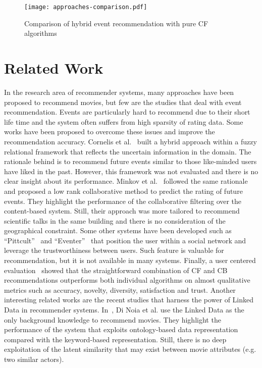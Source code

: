 \begin{figure}[H]
  \centering
  \texttt{[image: approaches-comparison.pdf]}
  \caption{Comparison of hybrid event recommendation with pure CF algorithms}
  \label{fig:approaches-comparison}
\end{figure}

\section{Related Work}
\label{sec:related-work}
In the research area of recommender systems, many approaches have been proposed to recommend movies, but few are the studies that deal with event recommendation. Events are particularly hard to recommend due to their short life time and the system often suffers from high sparsity of rating data. Some works have been proposed to overcome these issues and improve the recommendation accuracy. Cornelis et al.~\cite{Cornelis:IICAI05} built a hybrid approach within a fuzzy relational framework that reflects the uncertain information in the domain. The rationale behind is to recommend future events similar to those like-minded users have liked in the past. However, this framework was not evaluated and there is no clear insight about its performance. Minkov et al.~\cite{Minkov:CIKM10} followed the same rationale and proposed a low rank collaborative method to predict the rating of future events. They highlight the performance of the collaborative filtering over the content-based system. Still, their approach was more tailored to recommend scientific talks in the same building and there is no consideration of the geographical constraint. Some other systems have been developed such as ``Pittcult''~\cite{Lee:RecSys08} and ``Eventer''~\cite{Kayaalp:ASONAM09} that position the user within a social network and leverage the trustworthiness between users. Such feature is valuable for recommendation, but it is not available in many systems. Finally, a user centered evaluation~\cite{Dooms:RecSys11} showed that the straightforward combination of CF and CB recommendations outperforms both individual algorithms on almost qualitative metrics such as accuracy, novelty, diversity, satisfaction and trust. Another interesting related works are the recent studies that harness the power of Linked Data in recommender systems. In~\cite{DiNoia:SEMANTICS12}, Di Noia et al. use the Linked Data as the only background knowledge to recommend movies. They highlight the performance of the system that exploits ontology-based data representation compared with the keyword-based representation. Still, there is no deep exploitation of the latent similarity that may exist between movie attributes (e.g. two similar actors).

